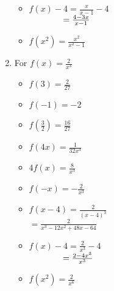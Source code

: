 \begin{enumerate}
\begin{multicols}{3}
\begin{itemize}
\vfill

\columnbreak
	
\item $f(x) - 4 = \frac{x}{x-1} - 4$ \\
      $\hphantom{f(x) - 4} = \frac{4-3x}{x-1}$
      
\vfill

\columnbreak
	
\item  $f\left(x^2\right) = \frac{x^2}{x^2-1}$

\end{itemize}
\end{multicols}


\item For $f(x) = \frac{2}{x^3}$ 

\begin{multicols}{3}
\begin{itemize}
\item $f(3) = \frac{2}{27}$
\item $f(-1) = -2$
\item $f\left(\frac{3}{2} \right) = \frac{16}{27}$
\end{itemize}
\end{multicols}

\begin{multicols}{3}
\begin{itemize}
\item  $f(4x) = \frac{1}{32x^3}$
\item $4f(x) = \frac{8}{x^3}$
\item $f(-x) = -\frac{2}{x^3}$
\end{itemize}
\end{multicols}

\begin{multicols}{3}
\begin{itemize}
\item  $f(x-4) = \frac{2}{(x-4)^3}$ \\
       $=\frac{2}{x^3-12x^2+48x-64}$
\vfill

\columnbreak
	

\item $f(x) - 4 = \frac{2}{x^3} - 4$ \\
      $\hphantom{f(x) - 4} = \frac{2-4x^3}{x^3}$
      
	
\item  $f\left(x^2\right) = \frac{2}{x^6}$

\end{itemize}
\end{multicols}


\end{enumerate}
